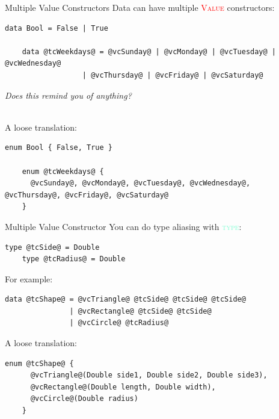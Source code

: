 \documentclass[xcolor={usenames,dvipsnames}]{beamer}
\newcommand{\hkeyword}[1]{\textcolor{Aquamarine}{\textsc{#1}}}
\newcommand{\hvalcon}[1]{\textcolor{Red}{\textsc{#1}}}
\begin{document}
\begin{frame}[fragile]{Multiple Value Constructors}
  Data can have multiple \hvalcon{Value} constructors:
  \begin{lstlisting}[style=hask]
    data Bool = False | True

    data @tcWeekdays@ = @vcSunday@ | @vcMonday@ | @vcTuesday@ | @vcWednesday@
                  | @vcThursday@ | @vcFriday@ | @vcSaturday@
  \end{lstlisting}
  \textit{\tiny{Does this remind you of anything?}}

  \pause
  \ \\
  A loose translation:
  \begin{lstlisting}[style=hask]
    enum Bool { False, True }

    enum @tcWeekdays@ {
      @vcSunday@, @vcMonday@, @vcTuesday@, @vcWednesday@, @vcThursday@, @vcFriday@, @vcSaturday@
    }
  \end{lstlisting}
\end{frame}

\begin{frame}[fragile]{Multiple Value Constructor}
  You can do type aliasing with \hkeyword{type}:
  \begin{lstlisting}[style=hask]
    type @tcSide@ = Double
    type @tcRadius@ = Double
  \end{lstlisting}

  \pause
  For example:
  \begin{lstlisting}[style=hask]
    data @tcShape@ = @vcTriangle@ @tcSide@ @tcSide@ @tcSide@
               | @vcRectangle@ @tcSide@ @tcSide@
               | @vcCircle@ @tcRadius@
  \end{lstlisting}

  \pause
  A loose translation:
  \begin{lstlisting}[style=hask]
    enum @tcShape@ {
      @vcTriangle@(Double side1, Double side2, Double side3),
      @vcRectangle@(Double length, Double width),
      @vcCircle@(Double radius)
    }
  \end{lstlisting}
\end{frame}
\end{document}
